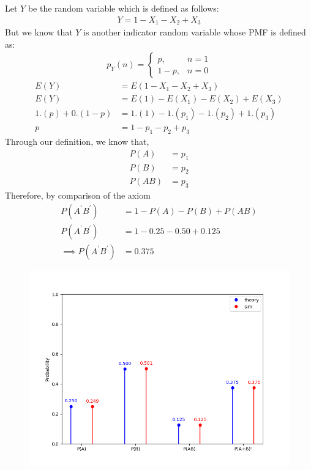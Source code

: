 \documentclass[journal]{IEEEtran}
\begin{document}
Let $Y$ be the random variable which is defined as follows:
\begin{align}
	Y = 1 - X_1 - X_2 + X_3
\end{align}
But we know that $Y$ is another indicator random variable whose PMF is defined as:
\begin{align}
	p_Y(n) =
	\begin{cases}
		p ,& n = 1\\
		1 - p ,& n = 0
	\end{cases}
\end{align}
\begin{align}
	E(Y) &= E(1 - X_1 - X_2 + X_3)\\
	E(Y) &= E(1) - E(X_1) - E(X_2) + E(X_3)\\
	1.(p) + 0.(1 - p) &= 1.(1) - 1.(p_1) - 1.(p_2) + 1.(p_3)\\
	p &= 1 - p_1 - p_2 + p_3
\end{align}
Through our definition, we know that,
\begin{align}
	P(A) &= p_1\\
	P(B) &= p_2\\
	P(AB) &= p_3
\end{align}
Therefore, by comparison of the axiom
\begin{align}
	P(A^\prime B^\prime ) &= 1 - P(A) - P(B) + P(AB) \\
	P(A^\prime B^\prime ) &= 1 - 0.25 - 0.50 + 0.125 \\
	\implies P(A^\prime B^\prime ) &= 0.375
\end{align}

\begin{figure}[ht]
    \centering
    \includegraphics[width=\columnwidth]{figs/plot.png}
    \label{fig:Plot1}
\end{figure}
\end{document}
